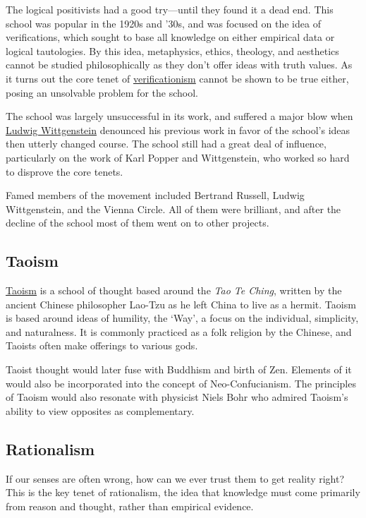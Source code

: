 \documentclass[../my_knowledge.tex]{subfiles}
\begin{document}
The logical positivists had a good try—until they found it a dead end. This school was popular in the 1920s and ’30s, and was focused on the idea of verifications, which sought to base all knowledge on either empirical data or logical tautologies. By this idea, metaphysics, ethics, theology, and aesthetics cannot be studied philosophically as they don’t offer ideas with truth values. As it turns out the core tenet of \href{https://en.wikipedia.org/wiki/Verificationism}{verificationism} cannot be shown to be true either, posing an unsolvable problem for the school.

The school was largely unsuccessful in its work, and suffered a major blow when \href{https://www.youtube.com/watch?v=pQ33gAyhg2c}{Ludwig Wittgenstein} denounced his previous work in favor of the school’s ideas then utterly changed course. The school still had a great deal of influence, particularly on the work of Karl Popper and Wittgenstein, who worked so hard to disprove the core tenets.

Famed members of the movement included Bertrand Russell, Ludwig Wittgenstein, and the Vienna Circle. All of them were brilliant, and after the decline of the school most of them went on to other projects. 

\subsection{Taoism}
\href{https://www.youtube.com/watch?v=dFb7Hxva5rg}{Taoism} is a school of thought based around the \textit{Tao Te Ching}, written by the ancient Chinese philosopher Lao-Tzu as he left China to live as a hermit. Taoism is based around ideas of humility, the ‘Way’, a focus on the individual, simplicity, and naturalness. It is commonly practiced as a folk religion by the Chinese, and Taoists often make offerings to various gods.

Taoist thought would later fuse with Buddhism and birth of Zen. Elements of it would also be incorporated into the concept of Neo-Confucianism. The principles of Taoism would also resonate with physicist Niels Bohr who admired Taoism’s ability to view opposites as complementary. 

\subsection{Rationalism}
If our senses are often wrong, how can we ever trust them to get reality right? This is the key tenet of rationalism, the idea that knowledge must come primarily from reason and thought, rather than empirical evidence.
\end{document}
